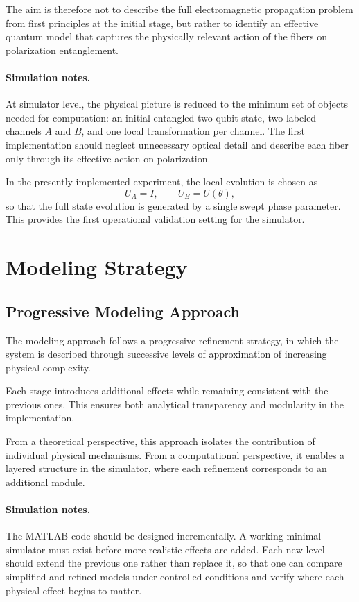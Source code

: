 \documentclass[a4paper]{article}
\begin{document}
The aim is therefore not to describe the full electromagnetic propagation problem from first principles at the initial stage, but rather to identify an effective quantum model that captures the physically relevant action of the fibers on polarization entanglement.

\paragraph{Simulation notes.}
At simulator level, the physical picture is reduced to the minimum set of objects needed for computation: an initial entangled two-qubit state, two labeled channels \(A\) and \(B\), and one local transformation per channel. The first implementation should neglect unnecessary optical detail and describe each fiber only through its effective action on polarization.

In the presently implemented experiment, the local evolution is chosen as
\[
U_A = I,
\qquad
U_B = U(\theta),
\]
so that the full state evolution is generated by a single swept phase parameter. This provides the first operational validation setting for the simulator.

\section{Modeling Strategy}

\subsection{Progressive Modeling Approach}

The modeling approach follows a progressive refinement strategy, in which the system is described through successive levels of approximation of increasing physical complexity.

Each stage introduces additional effects while remaining consistent with the previous ones. This ensures both analytical transparency and modularity in the implementation.

From a theoretical perspective, this approach isolates the contribution of individual physical mechanisms. From a computational perspective, it enables a layered structure in the simulator, where each refinement corresponds to an additional module.

\paragraph{Simulation notes.}
The MATLAB code should be designed incrementally. A working minimal simulator must exist before more realistic effects are added. Each new level should extend the previous one rather than replace it, so that one can compare simplified and refined models under controlled conditions and verify where each physical effect begins to matter.
\end{document}
